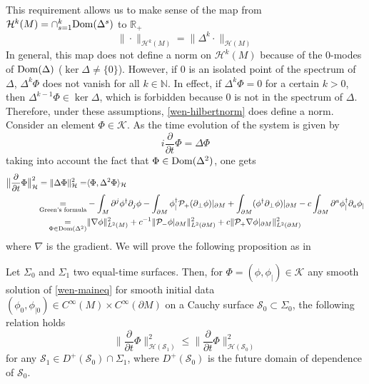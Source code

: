 This requirement allows us to make sense of the map
from $\mathcal{H}^k(M) = \cap_{s=1}^{k} \mathrm{Dom}(\Delta^s)$ to $\mathbb{R}_+$
\begin{equation}\label{wen-hilbertnorm}
\| \cdot \|_{\mathcal{H}^k(M)} = \| \Delta^k \cdot \|_{\mathcal{H}(M)}
\end{equation}
In general, this map does not define a norm on $\mathcal{H}^k(M)$ because of the 0-modes of $\mathrm{Dom}(\Delta)$ ($\ker \Delta \neq \{0\}$).
However, 
if 0 is an isolated point of the spectrum of $\Delta$, $\Delta^k \Phi$ does not vanish for all $k\in\mathbb{N}$.
In effect, 
if $\Delta^k \Phi = 0$ for a certain $k>0$,
then $\Delta^{k-1}\Phi\in\ker\Delta$, which is forbidden because $0$ is not in the spectrum of $\Delta$.
Therefore, under these assumptions, 
\cref{wen-hilbertnorm} does define a norm.
%
Consider an element $\Phi \in \mathcal{K}$.
As the time evolution of the system is given by
\begin{equation*}
i \frac{\partial }{\partial t} \Phi = \Delta \Phi 
\end{equation*}
taking into account the fact that $\Phi\in\mathrm{Dom}(\Delta^2)$, one gets
\begin{equation}\label{wen-tobebounded}
\begin{split}
\big\| \frac{\partial }{\partial t} \Phi \big\|^2_\mathcal{H} = \| \Delta \Phi \|^2_{\mathcal{H}}  = &
\langle \Phi, \Delta^2 \Phi \rangle_{\mathcal{H}}   \\ 
\underset{\textrm{Green's formula}}=
& - \int_M \partial^j \phi^\dagger \partial_j \phi 
 -  \int_{\partial M}\phi_|^\dagger \mathcal{P}_+(\partial_\bot \phi)\vert_{\partial M} 
 + \int_{\partial M} (\phi^\dagger \partial_\bot\phi)\vert_{\partial M}
- c\int_{\partial M} \partial^a \phi^\dagger_| \partial_a \phi_| \\
\underset{\Phi \in \mathrm{Dom}(\Delta^2)}{=} &
\|\nabla \phi \|^2_{L^2 (M)} + c^{-1} \| \mathcal{P}_- \phi\vert_{\partial M} \|^2_{L^2(\partial M)}
+ c \| \mathcal{P}_+ \nabla \phi\vert_{\partial M} \|^2_{L^2(\partial M)}
\end{split}
\end{equation}
where $\nabla$ is the gradient.
We will prove the following proposition as in~\cite{Zahn2016}
\begin{proposition}\label{wen-propcau}
Let $\Sigma_0$ and $\Sigma_1$ two equal-time surfaces. 
Then, for $\Phi = (\phi, \phi_|) \in \mathcal{K}$ any smooth solution of \cref{wen-maineq} for smooth initial data $(\phi_0, \phi_{|0}) \in C^\infty(M) \times C^\infty(\partial M)$ on a Cauchy surface $\mathcal{S}_0 \subset \Sigma_0$,
the following relation holds
\begin{equation}\label{wen-causal}
\big\| \frac{\partial}{\partial t} \Phi \big\|_{\mathcal{H}(\mathcal{S}_1)}^2
\leq 
\big\| \frac{\partial}{\partial t} \Phi \big\|_{\mathcal{H}(\mathcal{S}_0)}^2
\end{equation}
for any $\mathcal{S}_1 \in D^+(\mathcal{S}_0)\cap\Sigma_1$, where $D^+(\mathcal{S}_0)$ is the future domain of dependence of $\mathcal{S}_0$.
\end{proposition}
